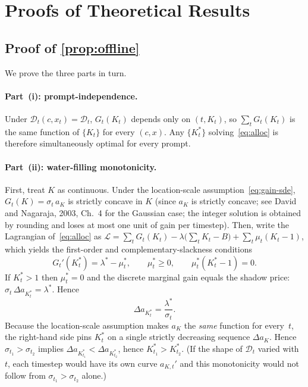 \section{Proofs of Theoretical Results}
\label{sec:proofs}

\subsection{Proof of \texorpdfstring{\cref{prop:offline}}{Proposition (Offline)}}
\label{sec:proof-offline}

We prove the three parts in turn.

\paragraph{Part~(i): prompt-independence.}
Under $\mathcal{D}_t(c,x_t)=\mathcal{D}_t$,
$G_t(K_t)$ depends only on $(t,K_t)$, so
$\sum_t G_t(K_t)$ is the same function of $\{K_t\}$ for every $(c,x)$.
Any $\{K_t^*\}$ solving~\eqref{eq:alloc} is therefore simultaneously
optimal for every prompt.

\paragraph{Part~(ii): water-filling monotonicity.}
First, treat $K$ as continuous.
Under the location-scale assumption~\eqref{eq:gain-sde},
$G_t(K)=\sigma_t\,a_K$ is strictly concave in $K$
(since $a_K$ is strictly concave; see David and Nagaraja, 2003,
Ch.~4 for the Gaussian case; the integer solution is obtained by
rounding and loses at most one unit of gain per timestep).
Then, write the Lagrangian of~\eqref{eq:alloc} as
$\mathcal{L}=\sum_t G_t(K_t)-\lambda\bigl(\sum_t K_t - B\bigr)
+\sum_t \mu_t(K_t-1)$,
which yields the first-order and complementary-slackness conditions
\[
  G_t'(K_t^*)=\lambda^*-\mu_t^*,
  \qquad
  \mu_t^*\ge 0,
  \qquad
  \mu_t^*(K_t^*-1)=0.
\]
If $K_t^*>1$ then $\mu_t^*=0$ and the discrete marginal gain equals the
shadow price: $\sigma_t\,\Delta a_{K_t^*}=\lambda^*$.
Hence
\[
  \Delta a_{K_t^*} = \frac{\lambda^*}{\sigma_t}.
\]
Because the location-scale assumption makes $a_K$ the \emph{same}
function for every~$t$, the right-hand side pins $K_t^*$ on a single
strictly decreasing sequence $\Delta a_K$.
Hence $\sigma_{t_1}>\sigma_{t_2}$
implies $\Delta a_{K_{t_1}^*} < \Delta a_{K_{t_2}^*}$, hence
$K_{t_1}^*>K_{t_2}^*$.
(If the shape of $\mathcal{D}_t$ varied with~$t$, each timestep would
have its own curve $a_{K,t}'$ and this monotonicity would not follow
from $\sigma_{t_1}>\sigma_{t_2}$ alone.)

